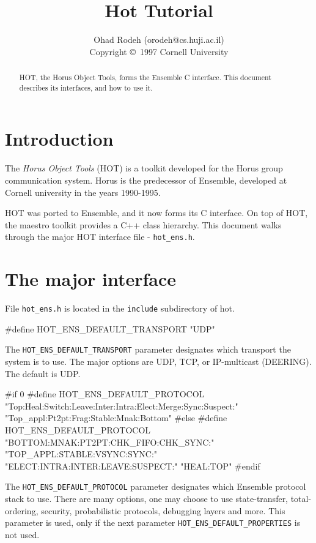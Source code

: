 \documentclass[11pt]{article}
\begin{document}
\title{Hot Tutorial}
\author{Ohad Rodeh (orodeh@cs.huji.ac.il) \\
\small{Copyright \copyright\ 1997 Cornell University}}

\maketitle

\begin{abstract}
HOT, the Horus Object Tools, forms the Ensemble C interface. This
document describes its interfaces, and how to use it. 
\end{abstract}

\section{Introduction}
The {\it Horus Object Tools} (HOT) is a toolkit developed for
the Horus group communication system. Horus is the predecessor of
Ensemble, developed at Cornell university in the years 1990-1995. 

HOT was ported to Ensemble, and it now forms its C interface. On top
of HOT, the maestro toolkit provides a C++ class hierarchy. This
document walks through the major HOT interface file - {\tt hot\_ens.h}.

\section{The major interface }
File {\tt hot\_ens.h} is located in the {\tt include} subdirectory 
of hot. 

\begin{codebox}
#define HOT_ENS_DEFAULT_TRANSPORT "UDP"
\end{codebox}
The {\tt HOT\_ENS\_DEFAULT\_TRANSPORT} parameter designates which
transport the system is to use. The major options are UDP, TCP,
or IP-multicast (DEERING). The default is UDP. 

\begin{codebox}
#if 0
#define HOT_ENS_DEFAULT_PROTOCOL 
      "Top:Heal:Switch:Leave:Inter:Intra:Elect:Merge:Sync:Suspect:" 
      "Top_appl:Pt2pt:Frag:Stable:Mnak:Bottom"
#else
#define HOT_ENS_DEFAULT_PROTOCOL 
   "BOTTOM:MNAK:PT2PT:CHK_FIFO:CHK_SYNC:" 
   "TOP_APPL:STABLE:VSYNC:SYNC:" 
   "ELECT:INTRA:INTER:LEAVE:SUSPECT:" 
   "HEAL:TOP"
#endif
\end{codebox}
The {\tt HOT\_ENS\_DEFAULT\_PROTOCOL} parameter designates which
Ensemble protocol stack to use. There are many options, one may choose
to use state-transfer, total-ordering, security, probabilistic
protocols, debugging layers and more. This parameter is used, only if
the next parameter {\tt HOT\_ENS\_DEFAULT\_PROPERTIES} is not used.
\end{document}

